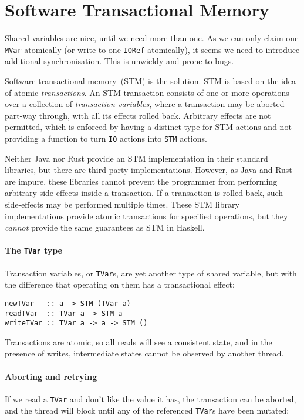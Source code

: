 \section{Software Transactional Memory}
\label{sec:concurrent_haskell-stm}

Shared variables are nice, until we need more than one.  As we can
only claim one \verb|MVar| atomically (or write to one \verb|IORef|
atomically), it seems we need to introduce additional synchronisation.
This is unwieldy and prone to bugs.

Software transactional memory~(STM) is the solution.  STM is based on
the idea of atomic \emph{transactions}.  An STM transaction consists
of one or more operations over a collection of \emph{transaction
  variables}, where a transaction may be aborted part-way through,
with all its effects rolled back.  Arbitrary effects are not
permitted, which is enforced by having a distinct type for STM actions
and not providing a function to turn \verb|IO| actions into \verb|STM|
actions.

Neither Java nor Rust provide an STM implementation in their standard
libraries, but there are third-party implementations.  However, as
Java and Rust are impure, these libraries cannot prevent the
programmer from performing arbitrary side-effects inside a
transaction.  If a transaction is rolled back, such side-effects may
be performed multiple times.  These STM library implementations
provide atomic transactions for specified operations, but they
\emph{cannot} provide the same guarantees as STM in Haskell.

\paragraph{The \texttt{TVar} type}
Transaction variables, or \verb|TVar|s, are yet another type of shared variable,
but with the difference that operating on them has a transactional effect:

\begin{verbatim}
newTVar   :: a -> STM (TVar a)
readTVar  :: TVar a -> STM a
writeTVar :: TVar a -> a -> STM ()
\end{verbatim}

Transactions are atomic, so all reads will see a consistent state, and
in the presence of writes, intermediate states cannot be observed by
another thread.

\paragraph{Aborting and retrying}
If we read a \verb|TVar| and don't like the value it has, the
transaction can be aborted, and the thread will block until any of the
referenced \verb|TVar|s have been mutated:

